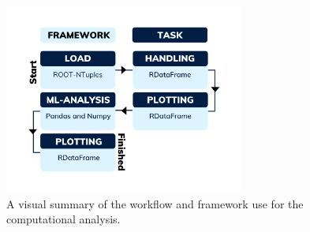 \begin{figure}
    \centering
    \includegraphics[width=0.7\textwidth]{Figures/Illustrations/TaskFlow.png}
    \caption{A visual summary of the workflow and framework use for the 
    computational analysis. }
    \label{fig:WF}
\end{figure}

